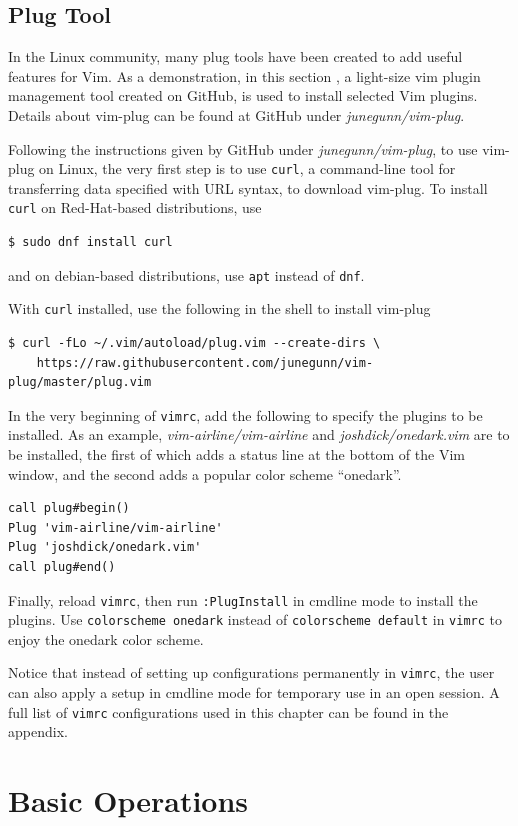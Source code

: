 \subsection{Plug Tool}

In the Linux community, many plug tools have been created to add useful features for Vim. As a demonstration, in this section , a light-size vim plugin management tool created on GitHub, is used to install selected Vim plugins. Details about vim-plug can be found at GitHub under \textit{junegunn/vim-plug}.

Following the instructions given by GitHub under \textit{junegunn/vim-plug}, to use vim-plug on Linux, the very first step is to use \verb|curl|, a command-line tool for transferring data specified with URL syntax, to download vim-plug. To install \verb|curl| on Red-Hat-based distributions, use
\begin{lstlisting}
$ sudo dnf install curl
\end{lstlisting}
and on debian-based distributions, use \verb|apt| instead of \verb|dnf|.

With \verb|curl| installed, use the following in the shell to install vim-plug
\begin{lstlisting}
$ curl -fLo ~/.vim/autoload/plug.vim --create-dirs \
    https://raw.githubusercontent.com/junegunn/vim-plug/master/plug.vim
\end{lstlisting}
In the very beginning of \verb|vimrc|, add the following to specify the plugins to be installed. As an example, \textit{vim-airline/vim-airline} and \textit{joshdick/onedark.vim} are to be installed, the first of which adds a status line at the bottom of the Vim window, and the second adds a popular color scheme ``onedark''.
\begin{lstlisting}
call plug#begin()
Plug 'vim-airline/vim-airline'
Plug 'joshdick/onedark.vim'
call plug#end()
\end{lstlisting}
Finally, reload \verb|vimrc|, then run \verb|:PlugInstall| in cmdline mode to install the plugins. Use \verb|colorscheme onedark| instead of \verb|colorscheme default| in \verb|vimrc| to enjoy the onedark color scheme.

Notice that instead of setting up configurations permanently in \verb|vimrc|, the user can also apply a setup in cmdline mode for temporary use in an open session. A full list of \verb|vimrc| configurations used in this chapter can be found in the appendix.

\section{Basic Operations}

